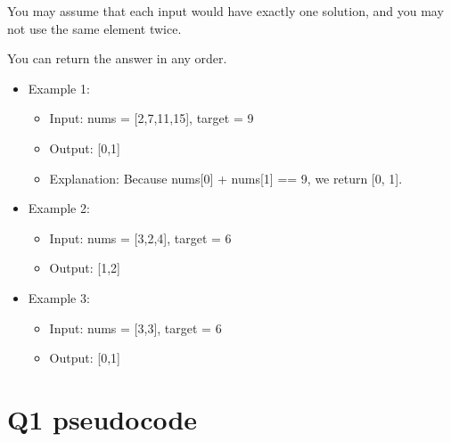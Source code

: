 \documentclass[11pt]{article}
\providecommand{\tightlist}{%
      \setlength{\itemsep}{0pt}\setlength{\parskip}{0pt}}
\begin{document}
You may assume that each input would have exactly one solution, and you
may not use the same element twice.

You can return the answer in any order.

\begin{itemize}
\tightlist
\item
  Example 1:

  \begin{itemize}
  \tightlist
  \item
    Input: nums = {[}2,7,11,15{]}, target = 9
  \item
    Output: {[}0,1{]}
  \item
    Explanation: Because nums{[}0{]} + nums{[}1{]} == 9, we return {[}0,
    1{]}.
  \end{itemize}
\item
  Example 2:

  \begin{itemize}
  \tightlist
  \item
    Input: nums = {[}3,2,4{]}, target = 6
  \item
    Output: {[}1,2{]}
  \end{itemize}
\item
  Example 3:

  \begin{itemize}
  \tightlist
  \item
    Input: nums = {[}3,3{]}, target = 6
  \item
    Output: {[}0,1{]}
  \end{itemize}
\end{itemize}

    \section{Q1 pseudocode}\label{q1-pseudocode}
\end{document}
